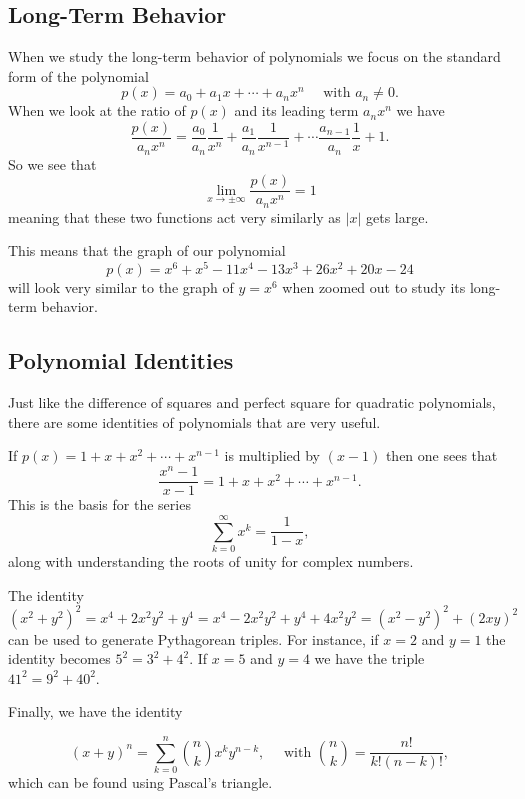 \documentclass[
]{book}
\theoremstyle{definition}
\theoremstyle{definition}
\theoremstyle{definition}
\theoremstyle{remark}
\begin{document}
\hypertarget{long-term-behavior}{%
\subsection{Long-Term Behavior}\label{long-term-behavior}}

When we study the long-term behavior of polynomials we focus on the standard form of the polynomial
\[p(x)=a_0 + a_1 x + \cdots + a_n x^n \quad \mbox{ with } a_n\neq 0.\] When we look at the ratio of \(p(x)\) and its leading term \(a_n x^n\) we have \[\frac{p(x)}{a_n x^n} = \frac{a_0}{a_n} \frac{1}{x^n} + \frac{a_1}{a_n} \frac{1}{x^{n-1}} + \cdots \frac{a_{n-1}}{a_n} \frac{1}{x} + 1.\] So we see that \[\lim_{x \rightarrow \pm \infty} \frac{p(x)}{a_n x^n} =1\] meaning that these two functions act very similarly as \(|x|\) gets large.

This means that the graph of our polynomial \[p(x)=x^6+x^5-11x^4-13x^3+26x^2+20x-24\] will look very similar to the graph of \(y=x^6\) when zoomed out to study its long-term behavior.

\hypertarget{polynomial-identities-1}{%
\subsection{Polynomial Identities}\label{polynomial-identities-1}}

Just like the difference of squares and perfect square for quadratic polynomials, there are some identities of polynomials that are very useful.

If \(p(x)=1+x+x^2+\cdots + x^{n-1}\) is multiplied by \((x-1)\) then one sees that
\[\frac{x^n-1}{x-1} = 1+x+x^2+\cdots + x^{n-1}.\] This is the basis for the series
\[\sum_{k=0}^\infty x^k = \frac{1}{1-x},\] along with understanding the roots of unity for complex numbers.

The identity
\[(x^2+y^2)^2= x^4+2x^2y^2+y^4 = x^4-2x^2y^2+y^4+4x^2y^2 = (x^2-y^2)^2 + (2xy)^2\] can be used to generate Pythagorean triples. For instance, if \(x=2\) and \(y=1\) the identity becomes \(5^2=3^2+4^2\). If \(x=5\) and \(y=4\) we have the triple \(41^2=9^2+40^2\).

Finally, we have the identity

\[(x+y)^n = \sum_{k=0}^{n} \binom{n}{k} x^k y^{n-k}, \quad \mbox{ with } \binom{n}{k} = \frac{n!}{k!(n-k)!},\] which can be found using Pascal's triangle.
\end{document}

